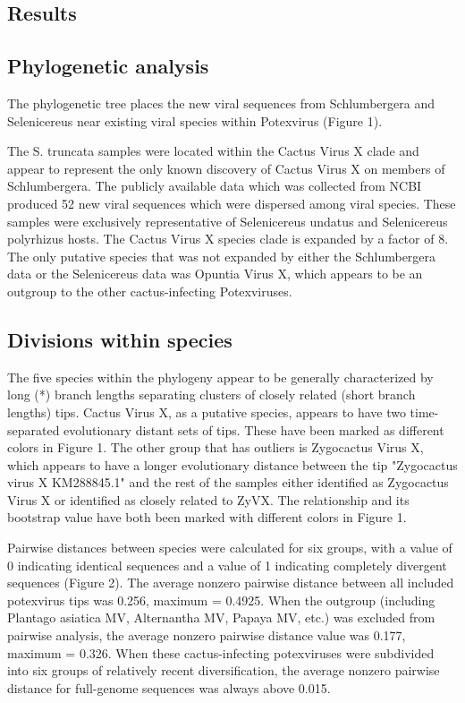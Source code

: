 \documentclass[11pt,letterpaper,titlepage]{article}
\begin{document}
\begin{linenumbers}
\section*{Results}

\subsection*{Phylogenetic analysis}
The phylogenetic tree places the new viral sequences from Schlumbergera and Selenicereus near existing viral species within Potexvirus (Figure 1). 

The S. truncata samples were located within the Cactus Virus X clade and appear to represent the only known discovery of Cactus Virus X on members of Schlumbergera. 
The publicly available data which was collected from NCBI produced 52 new viral sequences which were dispersed among viral species. 
These samples were exclusively representative of Selenicereus undatus and Selenicereus polyrhizus hosts. 
The Cactus Virus X species clade is expanded by a factor of 8. 
The only putative species that was not expanded by either the Schlumbergera data or the Selenicereus data was Opuntia Virus X, which appears to be an outgroup to the other cactus-infecting Potexviruses. 

\subsection*{Divisions within species}
The five species within the phylogeny appear to be generally characterized by long (*) branch lengths separating clusters of closely related (short branch lengths) tips. 
Cactus Virus X, as a putative species, appears to have two time-separated evolutionary distant sets of tips. 
These have been marked as different colors in Figure 1. 
The other group that has outliers is Zygocactus Virus X, which appears to have a longer evolutionary distance between the tip "Zygocactus virus X KM288845.1" and the rest of the samples either identified as Zygocactus Virus X or identified as closely related to ZyVX. 
The relationship and its bootstrap value have both been marked with different colors in Figure 1. 

Pairwise distances between species were calculated for six groups, with a value of 0 indicating identical sequences and a value of 1 indicating completely divergent sequences (Figure 2). 
The average nonzero pairwise distance between all included potexvirus tips was 0.256, maximum = 0.4925. 
When the outgroup (including Plantago asiatica MV, Alternantha MV, Papaya MV, etc.) was excluded from pairwise analysis, the average nonzero pairwise distance value was 0.177, maximum = 0.326. 
When these cactus-infecting potexviruses were subdivided into six groups of relatively recent diversification, the average nonzero pairwise distance for full-genome sequences was always above 0.015. 


\end{linenumbers}
\end{document}
